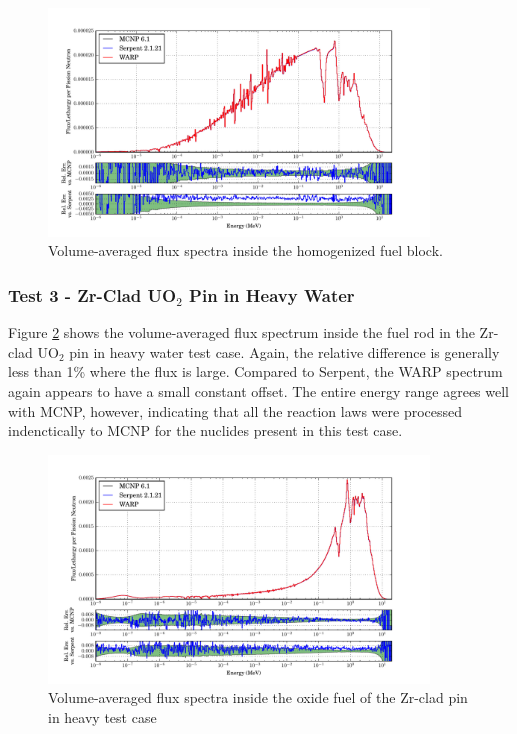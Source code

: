 \documentclass[preprint,12pt]{elsarticle}
\begin{document}

\begin{figure}[h!]
\centering
\includegraphics[width=0.9\textwidth,trim= 1cm 0cm 1cm 0cm]{graphics/homfuel_spec.pdf}
\caption{Volume-averaged flux spectra inside the homogenized fuel block. \label{homfuel_spec} }
\end{figure}

\newpage
\subsubsection{Test 3 - Zr-Clad UO$_2$ Pin in Heavy Water}

Figure \ref{pincell_spec} shows the volume-averaged flux spectrum inside the fuel rod in the Zr-clad UO$_2$ pin in heavy water test case.  Again, the relative difference is generally less than 1\% where the flux is large.  Compared to Serpent, the WARP spectrum again appears to have a small constant offset.  The entire energy range agrees well with MCNP, however, indicating that all the reaction laws were processed indenctically to MCNP for the nuclides present in this test case.


\begin{figure}[h!]
\centering
\includegraphics[width=0.9\textwidth,trim= 1cm 0cm 1cm 0cm]{graphics/pincell_spec.pdf}
\caption{Volume-averaged flux spectra inside the oxide fuel of the Zr-clad pin in heavy test case \label{pincell_spec} }
\end{figure}
\end{document}
